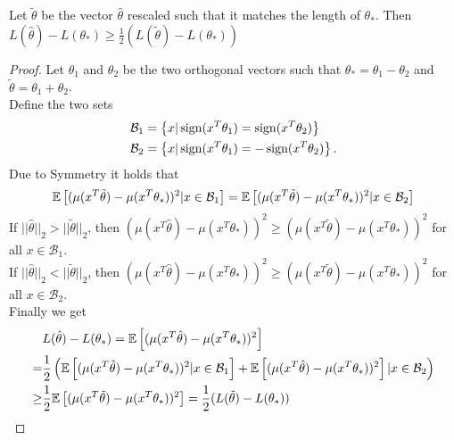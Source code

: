 \begin{lemma}
    Let $\tilde{\theta}$ be the vector $\hat{\theta}$ rescaled such that it matches the length of $\theta_*$. Then 
    $L(\hat{\theta})-L(\theta_*) \geq \frac{1}{2}(L(\tilde{\theta})-L(\theta_*))$
\end{lemma}
\begin{proof}
Let $\theta_1$ and $\theta_2$ be the two orthogonal vectors such that $\theta_* = \theta_1-\theta_2$ and $\tilde{\theta}=\theta_1+\theta_2$.\\
Define the two sets
\begin{align*}
\mathcal{B}_1 &= \left\{x|\operatorname{sign}(x^T\theta_1)=\operatorname{sign}(x^T\theta_2)\right\}\\ 
\mathcal{B}_2 &= \left\{x|\operatorname{sign}(x^T\theta_1)=-\operatorname{sign}(x^T\theta_2)\right\}.
\end{align*}
Due to Symmetry it holds that 
$$\mathbb{E}\left[(\mu(x^T\tilde{\theta})-\mu(x^T\theta_*))^2|x\in\mathcal{B}_1\right]=\mathbb{E}\left[(\mu(x^T\tilde{\theta})-\mu(x^T\theta_*))^2|x\in\mathcal{B}_2\right]$$
If $||\hat{\theta}||_2 > ||\tilde{\theta}||_2$, then $(\mu(x^T\hat{\theta})-\mu(x^T\theta_*))^2 \geq (\mu(x^T\tilde{\theta})-\mu(x^T\theta_*))^2$ for all $x\in \mathcal{B}_1$.\\
If $||\hat{\theta}||_2 < ||\tilde{\theta}||_2$, then $(\mu(x^T\hat{\theta})-\mu(x^T\theta_*))^2 \geq (\mu(x^T\tilde{\theta})-\mu(x^T\theta_*))^2$ for all $x\in \mathcal{B}_2$.\\
Finally we get
\begin{align*}
     &L(\hat{\theta})-L(\theta_*) = \mathbb{E}\left[(\mu(x^T\hat{\theta})-\mu(x^T\theta_*))^2\right]\\
     =& \frac{1}{2}\left(\mathbb{E}\left[(\mu(x^T\hat{\theta})-\mu(x^T\theta_*))^2|x\in\mathcal{B}_1\right]+\mathbb{E}\left[(\mu(x^T\hat{\theta})-\mu(x^T\theta_*))^2\right]|x\in\mathcal{B}_2\right)\\
     \geq& \frac{1}{2}\mathbb{E}\left[(\mu(x^T\tilde{\theta})-\mu(x^T\theta_*))^2\right]=\frac{1}{2}(L(\tilde{\theta})-L(\theta_*))
\end{align*}
\end{proof}
